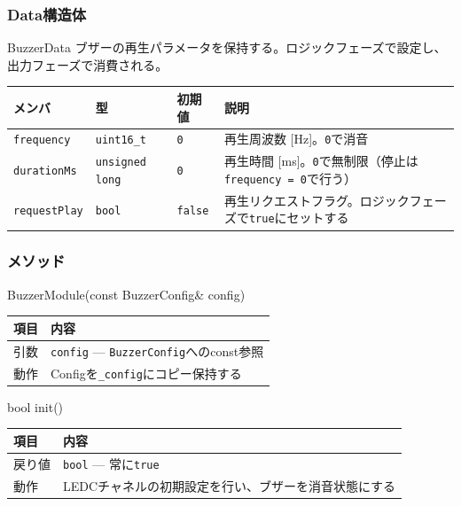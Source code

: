 \subsubsection{Data構造体}

\begin{funcblock}{BuzzerData}
ブザーの再生パラメータを保持する。ロジックフェーズで設定し、出力フェーズで消費される。

\begin{longtable}{l l l p{4.5cm}}
\toprule
\textbf{メンバ} & \textbf{型} & \textbf{初期値} & \textbf{説明} \\
\midrule
\endhead
\texttt{frequency}   & \texttt{uint16\_t}      & \texttt{0}     & 再生周波数 [Hz]。\texttt{0}で消音 \\
\texttt{durationMs}  & \texttt{unsigned long}  & \texttt{0}     & 再生時間 [ms]。\texttt{0}で無制限（停止は\texttt{frequency = 0}で行う） \\
\texttt{requestPlay} & \texttt{bool}           & \texttt{false} & 再生リクエストフラグ。ロジックフェーズで\texttt{true}にセットする \\
\bottomrule
\end{longtable}
\end{funcblock}

\subsubsection{メソッド}

\begin{funcblock}{BuzzerModule(const BuzzerConfig\& config)}
\begin{tabularx}{\textwidth}{l X}
\toprule
\textbf{項目} & \textbf{内容} \\
\midrule
引数   & \texttt{config} --- \texttt{BuzzerConfig}へのconst参照 \\
動作   & Configを\texttt{\_config}にコピー保持する \\
\bottomrule
\end{tabularx}
\end{funcblock}

\begin{funcblock}{bool init()}
\begin{tabularx}{\textwidth}{l X}
\toprule
\textbf{項目} & \textbf{内容} \\
\midrule
戻り値   & \texttt{bool} --- 常に\texttt{true} \\
動作     & LEDCチャネルの初期設定を行い、ブザーを消音状態にする \\
\bottomrule
\end{tabularx}
\end{funcblock}

